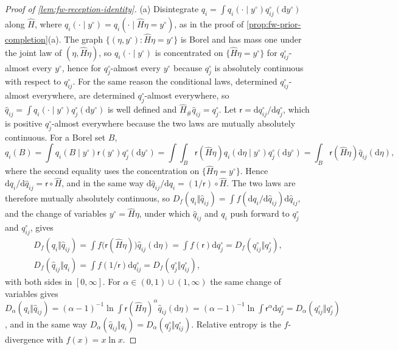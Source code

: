 \begin{proof}[Proof of \cref{lem:fw-reception-identity}]
(a) Disintegrate $q_i=\int q_i(\cdot\mid y^\circ)q^\circ_{ij}(\mathrm dy^\circ)$ along $\hat H$, where $q_i(\cdot\mid y^\circ)=q_i(\cdot\mid\hat H\eta=y^\circ)$, as in the proof of \cref{prop:fw-prior-completion}(a). The graph $\{(\eta,y^\circ):\hat H\eta=y^\circ\}$ is Borel and has mass one under the joint law of $(\eta,\hat H\eta)$, so $q_i(\cdot\mid y^\circ)$ is concentrated on $\{\hat H\eta=y^\circ\}$ for $q^\circ_{ij}$-almost every $y^\circ$, hence for $q^\circ_j$-almost every $y^\circ$ because $q^\circ_j$ is absolutely continuous with respect to $q^\circ_{ij}$. For the same reason the conditional laws, determined $q^\circ_{ij}$-almost everywhere, are determined $q^\circ_j$-almost everywhere, so $\hat q_{ij}=\int q_i(\cdot\mid y^\circ)q^\circ_j(\mathrm dy^\circ)$ is well defined and $\hat H_\#\hat q_{ij}=q^\circ_j$. Let $\mathsf r=\mathrm dq^\circ_{ij}/\mathrm dq^\circ_j$, which is positive $q^\circ_j$-almost everywhere because the two laws are mutually absolutely continuous. For a Borel set $B$,
\[
q_i(B)=\int q_i(B\mid y^\circ)\mathsf r(y^\circ)q^\circ_j(\mathrm dy^\circ)=\int\int_B\mathsf r(\hat H\eta)q_i(\mathrm d\eta\mid y^\circ)q^\circ_j(\mathrm dy^\circ)=\int_B\mathsf r(\hat H\eta)\hat q_{ij}(\mathrm d\eta),
\]
where the second equality uses the concentration on $\{\hat H\eta=y^\circ\}$. Hence $\mathrm dq_i/\mathrm d\hat q_{ij}=\mathsf r\circ\hat H$, and in the same way $\mathrm d\hat q_{ij}/\mathrm dq_i=(1/\mathsf r)\circ\hat H$. The two laws are therefore mutually absolutely continuous, so $D_f(q_i\Vert\hat q_{ij})=\int f(\mathrm dq_i/\mathrm d\hat q_{ij})\mathrm d\hat q_{ij}$, and the change of variables $y^\circ=\hat H\eta$, under which $\hat q_{ij}$ and $q_i$ push forward to $q^\circ_j$ and $q^\circ_{ij}$, gives
\begin{gather*}
D_f(q_i\Vert\hat q_{ij})=\int f\bigl(\mathsf r(\hat H\eta)\bigr)\hat q_{ij}(\mathrm d\eta)=\int f(\mathsf r)\mathrm dq^\circ_j=D_f(q^\circ_{ij}\Vert q^\circ_j),\\
D_f(\hat q_{ij}\Vert q_i)=\int f(1/\mathsf r)\mathrm dq^\circ_{ij}=D_f(q^\circ_j\Vert q^\circ_{ij}),
\end{gather*}
with both sides in $[0,\infty]$. For $\alpha\in(0,1)\cup(1,\infty)$ the same change of variables gives $D_\alpha(q_i\Vert\hat q_{ij})=(\alpha-1)^{-1}\ln\int\mathsf r(\hat H\eta)^\alpha\hat q_{ij}(\mathrm d\eta)=(\alpha-1)^{-1}\ln\int\mathsf r^\alpha\mathrm dq^\circ_j=D_\alpha(q^\circ_{ij}\Vert q^\circ_j)$, and in the same way $D_\alpha(\hat q_{ij}\Vert q_i)=D_\alpha(q^\circ_j\Vert q^\circ_{ij})$. Relative entropy is the $f$-divergence with $f(x)=x\ln x$.


\end{proof}
